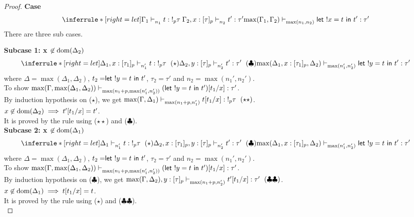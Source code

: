 \documentclass{article}
\begin{document}
\begin{proof}
\noindent \textbf{Case} 
$$
   \inferrule*[ right = let ]
   {\Gamma_1 \jtype{n_1}{}{t}{!_p \tau} \\ \Gamma_2, x: [\tau]_p \jtype{n_2}{}{t'}{\tau'}}
   { \max(\Gamma_1, \Gamma_2)  \jtype{\max(n_1,n_2)}{}{\letx{!x}{t}{t'}}{\tau'}  }
$$
There are three sub cases.

\textbf{Subcase 1: x $\not \in \text{dom}(\Delta_2)$ }
\[
   \inferrule*[ right = let ]
   {\Delta_1, x: [\tau_1]_p \jtype{n_1'}{}{t}{!_p \tau}~(\star) \\ \Delta_2, y: [\tau]_p \jtype{n_2'}{}{t'}{\tau'}~(\clubsuit)}
   {  \max(\Delta_1, x: [\tau_1]_p, \Delta_2) \jtype{\max(n_1',n_2')}{}{\letx{!y}{t}{t'}}{\tau'}  }
\]
where $\Delta = \max(\Delta_1, \Delta_2)$, $t_2 =\mathrel{ \mathsf{let}\ {!y} = {t} \ \mathsf{in} \ {t'} }$, $\tau_2 = \tau'$ and $n_2 = \max(n_1', n_2')$.\\
To show $ \max(\Gamma, \max(\Delta_1,\Delta_2) ) \mathrel{\vdash_{\max(n_1 + p,\max(n_1',n_2') )}^{} {(\mathrel{ \mathsf{let}\ {!y} = {t} \ \mathsf{in} \ {t'} })[t_1/x] } : {\tau'}}  $. \\
 By induction hypothesis on ($\star$), we get $\max(\Gamma, \Delta_1) \jtype{\max(n_1 + p,n_1') }{}{t[t_1/x]}{!_p \tau}~(\star\star) $. \\
 $x \not \in \text{dom}(\Delta_2) \implies t'[t_1/x] =  t'$.\\
 It is proved by the rule  using ($\star\star$) and ($\clubsuit$). \\

\textbf{Subcase 2: x $\not \in \text{dom}(\Delta_1)$ }
\[
   \inferrule*[ right = let ]
   {\Delta_1 \jtype{n_1'}{}{t}{!_p \tau}~(\star) \\ \Delta_2, x: [\tau_1]_p, y: [\tau]_p \jtype{n_2'}{}{t'}{\tau'}~(\clubsuit)}
   {  \max(\Delta_1, x: [\tau_1]_p, \Delta_2) \jtype{\max(n_1',n_2')}{}{\letx{!y}{t}{t'}}{\tau'}  }
\]
where $\Delta = \max(\Delta_1, \Delta_2)$, $t_2 =\mathrel{ \mathsf{let}\ {!y} = {t} \ \mathsf{in} \ {t'} }$, $\tau_2 = \tau'$ and $n_2 = \max(n_1', n_2')$.\\
To show $ \max(\Gamma, \max(\Delta_1,\Delta_2) ) \mathrel{\vdash_{\max(n_1 + p,\max(n_1',n_2') )}^{} {  (\mathrel{ \mathsf{let}\ {!y} = {t} \ \mathsf{in} \ {t'} })[t_1/x] } : {\tau'}}$. \\
By induction hypothesis on ($\clubsuit$), we get $\max(\Gamma, \Delta_2),y:[\tau]_p \mathrel{\vdash_{\max(n_1 + p,n_2') }^{} {t'[t_1/x]} : {\tau'}}~(\clubsuit\clubsuit) $. \\
 $x \not \in \text{dom}(\Delta_1) \implies t[t_1/x] = t $.\\
It is proved by the rule  using ($\star$) and ($\clubsuit\clubsuit$). \\


\end{proof}
\end{document}

